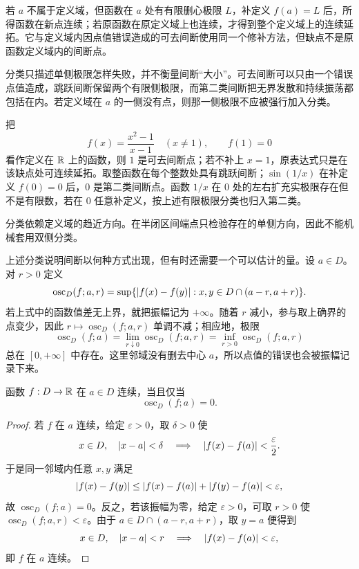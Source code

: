 若 \(a\) 不属于定义域，但函数在 \(a\) 处有有限删心极限 \(L\)，补定义 \(f(a)=L\) 后，所得函数在新点连续；若原函数在原定义域上也连续，才得到整个定义域上的连续延拓。它与定义域内因点值错误造成的可去间断使用同一个修补方法，但缺点不是原函数定义域内的间断点。

分类只描述单侧极限怎样失败，并不衡量间断“大小”。可去间断可以只由一个错误点值造成，跳跃间断保留两个有限侧极限，而第二类间断把无界发散和持续振荡都包括在内。若定义域在 \(a\) 的一侧没有点，则那一侧极限不应被强行加入分类。

\begin{example}
把
\[
 f(x)=\frac{x^2-1}{x-1}\quad(x\ne1),\qquad f(1)=0
\]
看作定义在 \(\mathbb{R}\) 上的函数，则 \(1\) 是可去间断点；若不补上 \(x=1\)，原表达式只是在该缺点处可连续延拓。取整函数在每个整数处具有跳跃间断；\(\sin(1/x)\) 在补定义 \(f(0)=0\) 后，\(0\) 是第二类间断点。函数 \(1/x\) 在 \(0\) 处的左右扩充实极限存在但不是有限数，若在 \(0\) 任意补定义，按上述有限极限分类也归入第二类。
\end{example}

分类依赖定义域的趋近方向。在半闭区间端点只检验存在的单侧方向，因此不能机械套用双侧分类。

上述分类说明间断以何种方式出现，但有时还需要一个可以估计的量。设 \(a\in D\)。对 \(r>0\) 定义
\[
 \operatorname{osc}_D(f;a,r)
 =\sup\{\left|f(x)-f(y)\right|:x,y\in D\cap(a-r,a+r)\}.
\]
若上式中的函数值差无上界，就把振幅记为 \(+\infty\)。随着 \(r\) 减小，参与取上确界的点变少，因此
\(r\mapsto\operatorname{osc}_D(f;a,r)\) 单调不减；相应地，极限
\[
 \operatorname{osc}_D(f;a)
 =\lim_{r\downarrow0}\operatorname{osc}_D(f;a,r)
 =\inf_{r>0}\operatorname{osc}_D(f;a,r)
\]
总在 \([0,+\infty]\) 中存在。这里邻域没有删去中心 \(a\)，所以点值的错误也会被振幅记录下来。

\begin{proposition}[连续性的振幅判据]
函数 \(f:D\to\mathbb{R}\) 在 \(a\in D\) 连续，当且仅当
\[
 \operatorname{osc}_D(f;a)=0.
\]
\end{proposition}

\begin{proof}
若 \(f\) 在 \(a\) 连续，给定 \(\varepsilon>0\)，取 \(\delta>0\) 使
\[
 x\in D,\quad \left|x-a\right|<\delta
 \quad\Longrightarrow\quad
 \left|f(x)-f(a)\right|<\frac{\varepsilon}{2}.
\]
于是同一邻域内任意 \(x,y\) 满足
\[
 \left|f(x)-f(y)\right|
 \le \left|f(x)-f(a)\right|+\left|f(y)-f(a)\right|<\varepsilon,
\]
故 \(\operatorname{osc}_D(f;a)=0\)。反之，若该振幅为零，给定 \(\varepsilon>0\)，可取 \(r>0\) 使
\(\operatorname{osc}_D(f;a,r)<\varepsilon\)。由于 \(a\in D\cap(a-r,a+r)\)，取 \(y=a\) 便得到
\[
 x\in D,\quad \left|x-a\right|<r
 \quad\Longrightarrow\quad
 \left|f(x)-f(a)\right|<\varepsilon,
\]
即 \(f\) 在 \(a\) 连续。
\end{proof}

